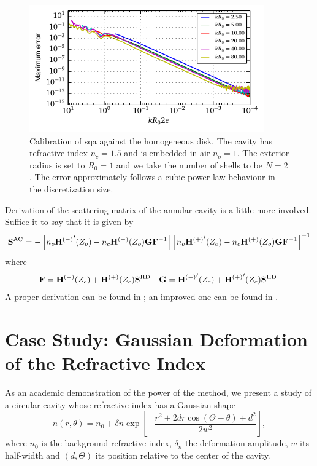 \begin{figure}
 \centering
 \includegraphics[width=0.9\textwidth]{figs/passive/convergenceHomo.pdf}
 \caption[Convergence properties of SQA when applied on the homogeneous disk]
	  {Calibration of \gls{sqa} against the homogeneous disk. The cavity 
	  has refractive index $n_c=1.5$ and is embedded in air $n_o=1$. The exterior
	  radius is set to $R_0=1$ and we take the number of shells to be $N=2$.
	  The error approximately follows a cubic power-law behaviour in the discretization
	  size.}
 \label{fig:passive.numerical.convergenceHomogeneousDisk}
\end{figure}

Derivation of the scattering matrix of the annular cavity is a little
more involved. Suffice it to say that it is given by 
  \begin{equation}
   \mathbf{S}^\text{AC} = -\left[n_o{\mathbf{H}^{(-)}}'(Z_o)-n_c\mathbf{H}^{(-)}(Z_o)\mathbf{GF}^{-1}\right]
			\left[n_o{\mathbf{H}^{(+)}}'(Z_o)-n_c\mathbf{H}^{(+)}(Z_o)\mathbf{GF}^{-1}\right]^{-1}
  \end{equation}
where 
  \begin{align}
   \mathbf{F} &= \mathbf{H}^{(-)}(Z_c)+\mathbf{H}^{(+)}(Z_c)\mathbf{S}^\text{HD} & \mathbf{G} = {\mathbf{H}^{(-)}}'(Z_c)+{\mathbf{H}^{(+)}}'(Z_c)\mathbf{S}^\text{HD}.
  \end{align}
A proper derivation can be found in \cite{HEN2002}; an improved
one can be found in \cite[Appendix D]{GAP2013}.



\section{Case Study: Gaussian Deformation of the Refractive Index}
As an academic demonstration of the power of the method, 
we present a study of a circular cavity whose refractive index
has a Gaussian shape
  \begin{equation}
   n(r,\theta) = n_0 + \delta n\exp\left[-\frac{r^2+2dr\cos\left(\Theta-\theta\right)+d^2}{2w^2}\right],
  \end{equation}
where $n_0$ is the background refractive index, $\delta _n$ the 
deformation amplitude, $w$ its half-width and $(d,\Theta)$
its position relative to the center of the cavity. 

